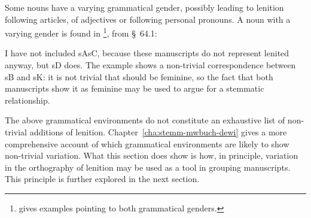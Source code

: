 Some nouns have a varying grammatical gender, possibly leading to lenition following articles, of adjectives or following personal pronouns. A noun with a varying gender  is found in  \footnote{\Textcite[s.v.~]{bevan_geiriadur_2014} gives examples pointing to both grammatical genders.}, from §~64.1:
\begin{mwl}
\end{mwl}
I have not included \gls{sA}\gls{sC}, because these manuscripts do not represent lenited  anyway, but \gls{sD} does. The example shows a non-trivial correspondence between \gls{sB} and \gls{sK}: it is not trivial that  should be feminine, so the fact that both manuscripts show it as feminine may be used to argue for a stemmatic relationship.

The above grammatical environments do not constitute an exhaustive list of non-trivial additions of lenition. Chapter~\ref{cha:stemm-mwbuch-dewi} gives a more comprehensive account of which grammatical environments are likely to show non-trivial variation. What this section does show is how, in principle, variation in the orthography of lenition may be used as a tool in grouping manuscripts. This principle is further explored in the next section.

